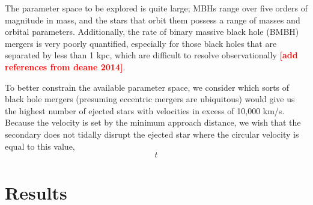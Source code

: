 \documentclass[a4paper,twocolumn]{emulateapj}
\newcommand{\colr}[1]{{\bf \textcolor{red}{[#1]}}}
\begin{document}
The parameter space to be explored is quite large; MBHs range over five orders of magnitude in mass, and the stars that orbit them possess a range of masses and orbital parameters. Additionally, the rate of binary massive black hole (BMBH) mergers is very poorly quantified, especially for those black holes that are separated by less than 1 kpc, which are difficult to resolve observationally \colr{add references from deane 2014}.

To better constrain the available parameter space, we consider which sorts of black hole mergers (presuming eccentric mergers are ubiquitous) would give us the highest number of ejected stars with velocities in excess of 10,000 km/s. Because the velocity is set by the minimum approach distance, we wish that the secondary does not tidally disrupt the ejected star where the circular velocity is equal to this value,
\begin{equation}
t
\end{equation}

\section{Results}\label{sec:results}
\end{document}
